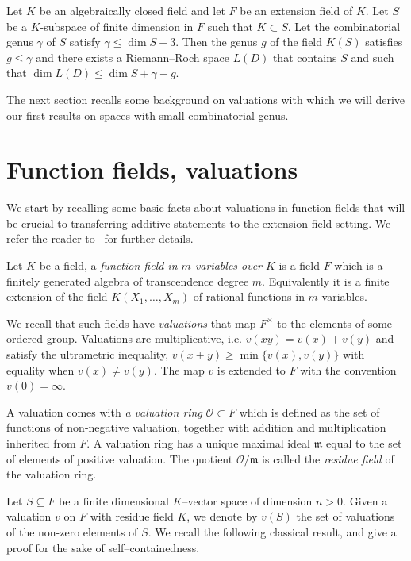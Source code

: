 \documentclass[ALCO,Unicode,ThmDefs]{cedram}
\newcommand*\OO{\mathcal{O}}
\newcommand*\m{\mathfrak m}
\renewcommand{\geq}{\geqslant}
\renewcommand{\leq}{\leqslant}
\begin{document}
\begin{conj}\label{conj}
Let $K$ be an algebraically closed field and let $F$ be an extension field of $K$. Let $S$ be a $K$-subspace of finite dimension in $F$ such that $K\subset S$. Let the combinatorial genus $\gamma$ of $S$ satisfy $\gamma\leq\dim S -3$. Then the genus $g$ of the field $K(S)$ satisfies $g\leq\gamma$ and there exists a Riemann--Roch space $L(D)$ that contains $S$ and such that $\dim L(D)\leq\dim S +\gamma -g$.
\end{conj}

The next section recalls some background on valuations with which we will derive our first results on spaces with small combinatorial genus.

\section{{Function fields, valuations}}\label{sec:valuations}

We start by recalling some basic facts about valuations in function fields that will be crucial to transferring additive statements to the extension field setting. We refer the reader to~\cite[Chapter~6]{Bourbaki_AlgComm5-6} for further details.

Let $K$ be a field, a \emph{function field in $m$ variables over $K$} is a field $F$ which is a finitely generated algebra of transcendence degree $m$. Equivalently it is a finite extension of the field $K(X_1, \ldots, X_m)$ of rational functions in $m$ variables.

We recall that such fields have \emph{valuations} that map $F^{\times}$ to the elements of some ordered group. Valuations are multiplicative, i.e. $v(xy)= v(x) + v(y)$ and satisfy the ultrametric inequality, $v(x+y)\geq\min \{v(x), v(y)\}$ with equality when $v(x) \neq v(y)$. The map $v$ is extended to $F$ with the convention $v(0)=\infty$.

A valuation comes with \emph{a valuation ring} $\OO \subset F$ which is defined as the set of functions of non-negative valuation, together with addition and multiplication inherited from $F$. A valuation ring has a unique maximal ideal $\m$ equal to the set of elements of positive valuation. The quotient $\OO/\m$ is called the \emph{residue field} of the valuation ring.

Let $S \subseteq F$ be a finite dimensional $K$--vector space of dimension $n>0$. Given a valuation $v$ on $F$ with residue field $K$, we denote by $v(S)$ the set of valuations of the non-zero elements of $S$. We recall the following classical result, and give a proof for the sake of self--containedness.
\end{document}
